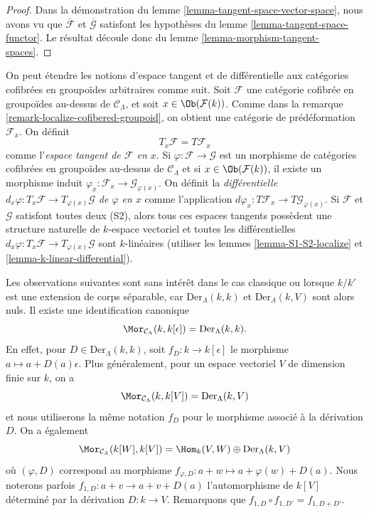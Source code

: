 \begin{proof}
Dans la démonstration du lemme \ref{lemma-tangent-space-vector-space}, nous
avons vu que $\overline{\mathcal{F}}$ et $\overline{\mathcal{G}}$ satisfont
les hypothèses du lemme \ref{lemma-tangent-space-functor}. Le résultat découle
donc du lemme \ref{lemma-morphism-tangent-spaces}.
\end{proof}

\begin{remark}
\label{remark-tangent-space-cofibered-groupoid}
On peut étendre les notions d'espace tangent et de différentielle aux
catégories cofibrées en groupoïdes arbitraires comme suit. Soit $\mathcal{F}$
une catégorie cofibrée en groupoïdes au-dessus de $\mathcal{C}_\Lambda$, et
soit $x \in \Ob(\mathcal{F}(k))$. Comme dans la remarque
\ref{remark-localize-cofibered-groupoid}, on obtient une catégorie de
prédéformation $\mathcal{F}_x$. On définit
$$
T_x\mathcal{F} = T\mathcal{F}_x
$$
comme l'{\it espace tangent de $\mathcal{F}$ en $x$}. Si
$\varphi : \mathcal{F} \to \mathcal{G}$ est un morphisme de catégories
cofibrées en groupoïdes au-dessus de $\mathcal{C}_\Lambda$ et si
$x \in \Ob(\mathcal{F}(k))$, il existe un morphisme induit
$\varphi_x: \mathcal{F}_x \to \mathcal{G}_{\varphi(x)}$. On définit la
{\it différentielle
$d_x \varphi : T_x \mathcal{F} \to T_{\varphi(x)} \mathcal{G}$
de $\varphi$ en $x$} comme l'application
$d \varphi_x: T \mathcal{F}_x \to T \mathcal{G}_{\varphi(x)}$.
Si $\mathcal{F}$ et $\mathcal{G}$ satisfont toutes deux (S2), alors tous ces
espaces tangents possèdent une structure naturelle de $k$-espace vectoriel et
toutes les différentielles
$d_x \varphi : T_x \mathcal{F} \to T_{\varphi(x)} \mathcal{G}$
sont $k$-linéaires (utiliser les lemmes \ref{lemma-S1-S2-localize} et
\ref{lemma-k-linear-differential}).
\end{remark}

\noindent
Les observations suivantes sont sans intérêt dans le cas classique ou lorsque
$k/k'$ est une extension de corps séparable, car
$\text{Der}_\Lambda(k, k)$ et $\text{Der}_\Lambda(k, V)$ sont alors nuls. Il
existe une identification canonique
$$
\Mor_{\mathcal{C}_\Lambda}(k, k[\epsilon]) =
\text{Der}_\Lambda(k, k).
$$
En effet, pour $D \in \text{Der}_\Lambda(k, k)$, soit
$f_D : k \to k[\epsilon]$ le morphisme $a \mapsto a + D(a)\epsilon$. Plus
généralement, pour un espace vectoriel $V$ de dimension finie sur $k$, on a
$$
\Mor_{\mathcal{C}_\Lambda}(k, k[V]) =
\text{Der}_\Lambda(k, V)
$$
et nous utiliserons la même notation $f_D$ pour le morphisme associé à la
dérivation $D$. On a également
$$
\Mor_{\mathcal{C}_\Lambda}(k[W], k[V]) =
\Hom_k(V, W) \oplus \text{Der}_\Lambda(k, V)
$$
où $(\varphi, D)$ correspond au morphisme
$f_{\varphi, D} : a + w \mapsto a + \varphi(w) + D(a)$. Nous noterons parfois
$f_{1, D} : a + v \to a + v + D(a)$ l'automorphisme de $k[V]$ déterminé par
la dérivation $D : k \to V$. Remarquons que
$f_{1, D} \circ f_{1, D'} = f_{1, D + D'}$.

